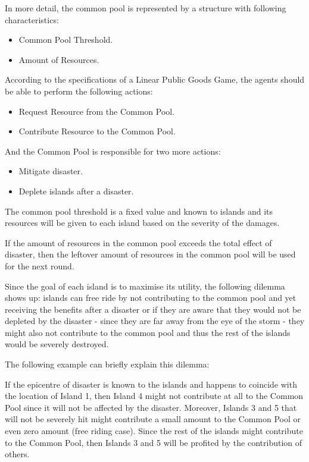 In more detail, the common pool is represented by a structure with following characteristics:

\begin{itemize}
    \item Common Pool Threshold.
    \item Amount of Resources.
\end{itemize}

According to the specifications of a Linear Public Goods Game, the agents should be able to perform the following actions:  

\begin{itemize}
    \item Request Resource from the Common Pool.
    \item Contribute Resource to the Common Pool. 
\end{itemize}

And the Common Pool is responsible for two more actions: 

\begin{itemize}
    \item Mitigate disaster.
    \item Deplete islands after a disaster.
\end{itemize}

The common pool threshold is a fixed value and known to islands and its resources will be given to each island based on the severity of the damages.

If the amount of resources in the common pool exceeds the total effect of disaster, then the leftover amount of resources in the common pool will be used for the next round.

Since the goal of each island is to maximise its utility, the following dilemma shows up: islands can free ride by not contributing to the common pool and yet receiving the benefits after a disaster or if they are aware that they would not be depleted by the disaster - since they are far away from the eye of the storm - they might also not contribute to the common pool and thus the rest of the islands would be severely destroyed.

The following example can briefly explain this dilemma:

If the epicentre of disaster is known to the islands and happens to coincide with the location of Island 1, then Island 4 might not contribute at all to the Common Pool since it will not be affected by the disaster. Moreover, Islands 3 and 5 that will not be severely hit might contribute a small amount to the Common Pool or even zero amount (free riding case). Since the rest of the islands might contribute to the Common Pool, then Islands 3 and 5 will be profited by the contribution of others.

